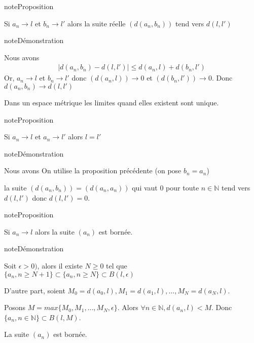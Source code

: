 \documentclass[letterpaper,10pt,french]{sphinxmanual}
\begin{document}
\begin{sphinxadmonition}{note}{Proposition}

\sphinxAtStartPar
Si \(a_n \longrightarrow l\) et \(b_n \longrightarrow l'\) alors la suite réelle \((d(a_n, b_n))\) tend vers \(d(l, l')\)
\end{sphinxadmonition}

\begin{sphinxadmonition}{note}{Démonstration}

\sphinxAtStartPar
Nous avons
\begin{equation*}
\begin{split}
\left | d(a_n, b_n) -  d(l, l') \right | \leq d(a_n, l) + d(b_n, l')
\end{split}
\end{equation*}
\sphinxAtStartPar
Or, \(a_n \longrightarrow l\) et \(b_n \longrightarrow l'\) donc  \((d(a_n, l)) \longrightarrow 0\) et \((d(b_n, l')) \longrightarrow 0\). Donc \(d(a_n, b_n) \longrightarrow  d(l, l')\)
\end{sphinxadmonition}

\sphinxAtStartPar
Dans un espace métrique les limites quand elles existent sont unique.

\begin{sphinxadmonition}{note}{Proposition}

\sphinxAtStartPar
Si \(a_n \longrightarrow l\) et \(a_n \longrightarrow l'\) alors  \(l=l'\)
\end{sphinxadmonition}

\begin{sphinxadmonition}{note}{Démonstration}

\sphinxAtStartPar
Nous avons
On utilise la proposition précédente (on pose \(b_n=a_n\))

\sphinxAtStartPar
la suite \((d(a_n, b_n))=(d(a_n, a_n))\) qui vaut 0 pour toute \(n \in \mathbb N\) tend vers \(d(l, l')\) donc \(d(l, l')=0\).
\end{sphinxadmonition}

\begin{sphinxadmonition}{note}{Proposition}

\sphinxAtStartPar
Si \(a_n \longrightarrow l\) alors la suite \((a_n)\) est bornée.
\end{sphinxadmonition}

\begin{sphinxadmonition}{note}{Démonstration}

\sphinxAtStartPar
Soit \(\epsilon>0)\), alors il existe \(N \geq 0\) tel que \(\{a_n, n \geq N+1\} \subset \{a_n, n \geq N\} \subset B(l, \epsilon)\)

\sphinxAtStartPar
D’autre part, soient \(M_0 = d(a_0, l), M_1 = d(a_1, l), \ldots, M_{N} = d(a_N, l)\).

\sphinxAtStartPar
Posons \(M= max\{M_0, M_1, \ldots, M_N, \epsilon \}\). Alors \(\forall n \in \mathbb N, d(a_n,l)<M\). Donc \(\{a_n, n \in \mathbb N\} \subset B(l, M)\).

\sphinxAtStartPar
La suite \((a_n)\) est bornée.
\end{sphinxadmonition}
\end{document}
